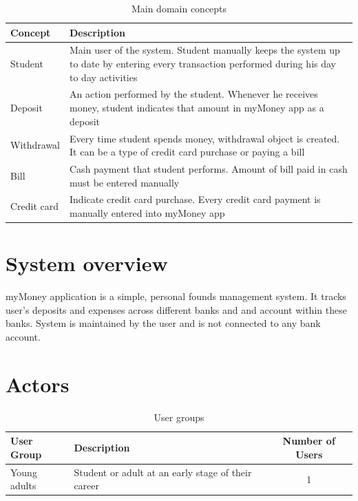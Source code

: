\documentclass[12pt]{article}
\begin{document}
 
 
\begin{table}[H]
\caption{Main domain concepts}
\begin{center}
\begin{tabular}{|p{3cm}|p{14cm}|}
\hline
Concept & Description \\
\hline\hline
Student & Main user of the system. Student manually keeps the system up to date by entering every transaction performed during his day to day activities  \\
\hline
Deposit & An action performed by the student. Whenever he receives money, student indicates that amount in myMoney app as a deposit \\
\hline
Withdrawal & Every time student spends money, withdrawal object is created. It can be a type of credit card purchase or paying a bill \\
\hline
Bill & Cash payment that student performs. Amount of bill paid in cash must be entered manually \\
\hline
Credit card & Indicate credit card purchase. Every credit card payment is manually entered into myMoney app \\
\hline
\end{tabular}
\end{center}
\end{table}

\section{System overview}


myMoney application is a simple, personal founds management system. It tracks user's deposits and expenses across different banks and and account within these banks. System is maintained by the user and is not connected to any bank account.

\section{Actors}

\begin{table}[H]
  \caption{User groups}
  \begin{center}
    \begin{tabular}{|l|p{8cm}|c|}
      \hline
      User Group & Description & Number of Users\\
      \hline\hline
      Young adults & Student or adult at an early stage of their career & 1\\
      \hline
    \end{tabular}
  \end{center}
\end{table}
\end{document}
